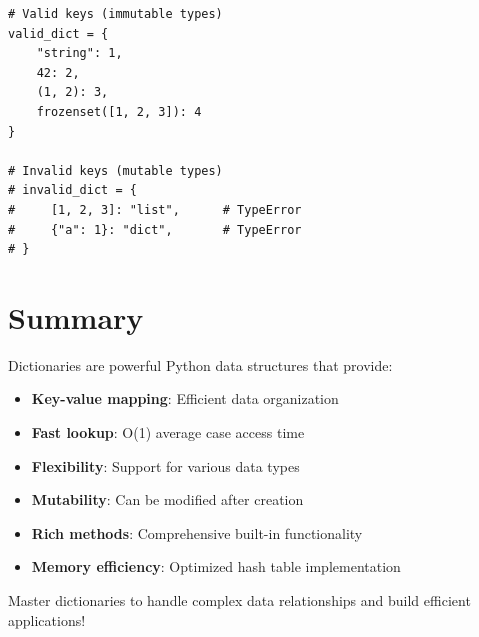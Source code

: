 \documentclass[12pt,a4paper]{article}
\begin{document}
\begin{lstlisting}
# Valid keys (immutable types)
valid_dict = {
    "string": 1,
    42: 2,
    (1, 2): 3,
    frozenset([1, 2, 3]): 4
}

# Invalid keys (mutable types)
# invalid_dict = {
#     [1, 2, 3]: "list",      # TypeError
#     {"a": 1}: "dict",       # TypeError
# }
\end{lstlisting}

\section{Summary}

Dictionaries are powerful Python data structures that provide:
\begin{itemize}
    \item \textbf{Key-value mapping}: Efficient data organization
    \item \textbf{Fast lookup}: O(1) average case access time
    \item \textbf{Flexibility}: Support for various data types
    \item \textbf{Mutability}: Can be modified after creation
    \item \textbf{Rich methods}: Comprehensive built-in functionality
    \item \textbf{Memory efficiency}: Optimized hash table implementation
\end{itemize}

Master dictionaries to handle complex data relationships and build efficient applications!
\end{document}
